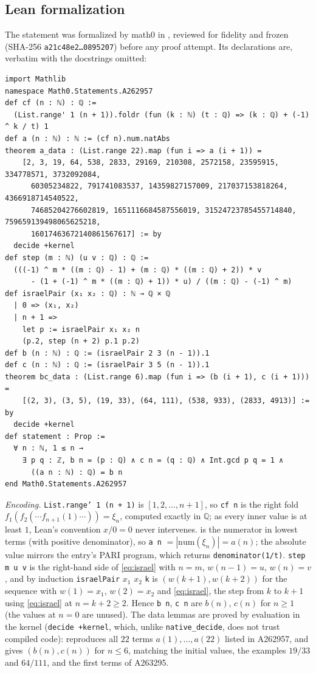\documentclass[11pt]{amsart}
\theoremstyle{plain}
\theoremstyle{definition}
\newcommand{\Q}{\mathbb{Q}}
\begin{document}
\subsection*{Lean formalization}
The statement was formalized by math0 in , reviewed for fidelity and frozen (SHA-256 \texttt{a21c48e2\dots0895207}) before any proof attempt. Its declarations are, verbatim with the docstrings omitted:
\begin{lstlisting}
import Mathlib
namespace Math0.Statements.A262957
def cf (n : ℕ) : ℚ :=
  (List.range' 1 (n + 1)).foldr (fun (k : ℕ) (t : ℚ) => (k : ℚ) + (-1) ^ k / t) 1
def a (n : ℕ) : ℕ := (cf n).num.natAbs
theorem a_data : (List.range 22).map (fun i => a (i + 1)) =
    [2, 3, 19, 64, 538, 2833, 29169, 210308, 2572158, 23595915, 334778571, 3732092084,
      60305234822, 791741083537, 14359827157009, 217037153818264, 4366918714540522,
      74685204276602819, 1651116684587556019, 31524723785455714840, 759659139498065625218,
      16017463672140861567617] := by
  decide +kernel
def step (m : ℕ) (u v : ℚ) : ℚ :=
  (((-1) ^ m * ((m : ℚ) - 1) + (m : ℚ) * ((m : ℚ) + 2)) * v
      - (1 + (-1) ^ m * ((m : ℚ) + 1)) * u) / ((m : ℚ) - (-1) ^ m)
def israelPair (x₁ x₂ : ℚ) : ℕ → ℚ × ℚ
  | 0 => (x₁, x₂)
  | n + 1 =>
    let p := israelPair x₁ x₂ n
    (p.2, step (n + 2) p.1 p.2)
def b (n : ℕ) : ℚ := (israelPair 2 3 (n - 1)).1
def c (n : ℕ) : ℚ := (israelPair 3 5 (n - 1)).1
theorem bc_data : (List.range 6).map (fun i => (b (i + 1), c (i + 1))) =
    [(2, 3), (3, 5), (19, 33), (64, 111), (538, 933), (2833, 4913)] := by
  decide +kernel
def statement : Prop :=
  ∀ n : ℕ, 1 ≤ n →
    ∃ p q : ℤ, b n = (p : ℚ) ∧ c n = (q : ℚ) ∧ Int.gcd p q = 1 ∧
      ((a n : ℕ) : ℚ) = b n
end Math0.Statements.A262957
\end{lstlisting}

\emph{Encoding.}
\texttt{List.range' 1 (n + 1)} is $[1,2,\dots,n+1]$, so \texttt{cf n} is the right fold $f_1(f_2(\cdots f_{n+1}(1)\cdots))=\xi_n$, computed exactly in $\Q$; as every inner value is at least $1$, Lean's convention $x/0=0$ never intervenes.
 is the numerator in lowest terms (with positive denominator), so \texttt{a n} $=|\mathrm{num}(\xi_n)|=a(n)$; the absolute value mirrors the entry's PARI program, which returns \texttt{denominator(1/t)}.
\texttt{step m u v} is the right-hand side of \eqref{eq:israel} with $n=m$, $w(n-1)=u$, $w(n)=v$, and by induction \texttt{israelPair} $x_1$ $x_2$ \texttt{k} is $(w(k+1),w(k+2))$ for the sequence with $w(1)=x_1$, $w(2)=x_2$ and \eqref{eq:israel}, the step from $k$ to $k+1$ using \eqref{eq:israel} at $n=k+2\ge2$. Hence \texttt{b n}, \texttt{c n} are $b(n)$, $c(n)$ for $n\ge1$ (the values at $n=0$ are unused).
The data lemmas are proved by evaluation in the kernel (\texttt{decide +kernel}, which, unlike \texttt{native\_decide}, does not trust compiled code):  reproduces all $22$ terms $a(1),\dots,a(22)$ listed in A262957, and  gives $(b(n),c(n))$ for $n\le6$, matching the initial values, the examples $19/33$ and $64/111$, and the first terms of A263295.
\end{document}
